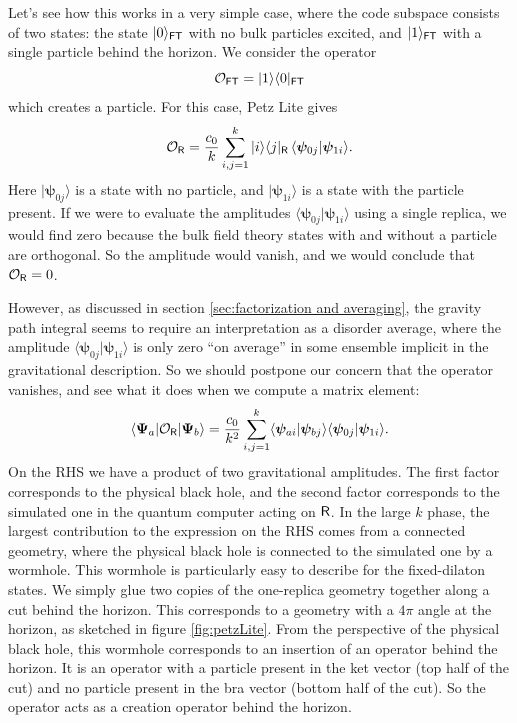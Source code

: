 \documentclass[12pt]{article}
\newcommand{\be}{\begin{equation}}
\newcommand{\ee}{\end{equation}}
\numberwithin{equation}{section}
\begin{document}
Let's see how this works in a very simple case, where the code subspace consists of two states: the state $|0\rangle_{\sf{FT}}$ with no bulk particles excited, and $|1\rangle_{\sf{FT}}$ with a single particle behind the horizon. We consider the operator
\be
\mathcal{O}_{\sf{FT}} = |1\rangle\langle 0|\label{example1}_{\sf{FT}}
\ee
which creates a particle. For this case, Petz Lite gives
\be
\mathcal{O}_{\sf{R}} = \frac{c_0}{k}\sum_{i,j=1}^k |i\rangle\langle j|_{\sf{R}}\,\langle\bm{\psi}_{0j}|\bm{\psi}_{1i}\rangle.
\ee
Here $|\bm{\psi}_{0j}\rangle$ is a state with no particle, and $|\bm{\psi}_{1i}\rangle$ is a state with the particle present. If we were to evaluate the amplitudes $\langle\bm{\psi}_{0j}|\bm{\psi}_{1i}\rangle$ using a single replica, we would find zero because the bulk field theory states with and without a particle are orthogonal. So the amplitude would vanish, and we would conclude that $\mathcal{O}_{\sf{R}} = 0$. 

However, as discussed  in section \ref{sec:factorization and averaging}, the gravity path integral seems to require an interpretation as a disorder average, where the amplitude $\langle\bm{\psi}_{0j}|\bm{\psi}_{1i}\rangle$ is only zero ``on average'' in some ensemble implicit in the gravitational description. So we should postpone our concern that the operator vanishes, and see what it does when we compute a matrix element:
\be
\langle \bm{\Psi}_a|\mathcal{O}_{\sf{R}}|\bm{\Psi}_b\rangle = \frac{c_0}{k^2}\sum_{i,j=1}^k\langle \bm{\psi}_{ai}|\bm{\psi}_{bj}\rangle\langle \bm{\psi}_{0j}|\bm{\psi}_{1i}\rangle.\label{PetzLiteexp}
\ee
On the RHS we have a product of two gravitational amplitudes. The first factor corresponds to the physical black hole, and the second factor corresponds to the simulated one in the quantum computer acting on ${\sf{R}}$. In the large $k$ phase, the largest contribution to the expression on the RHS comes from a connected geometry, where the physical black hole is connected to the simulated one by a wormhole. This wormhole is particularly easy to describe for the fixed-dilaton states. We simply glue two copies of the one-replica geometry together along a cut behind the horizon. This corresponds to a geometry with a $4\pi$ angle at the horizon, as sketched in figure \ref{fig:petzLite}. From the perspective of the physical black hole, this wormhole corresponds to an insertion of an operator behind the horizon. It is an operator with a particle present in the ket vector (top half of the cut) and no particle present in the bra vector (bottom half of the cut). So the operator acts as a creation operator behind the horizon.
\end{document}
